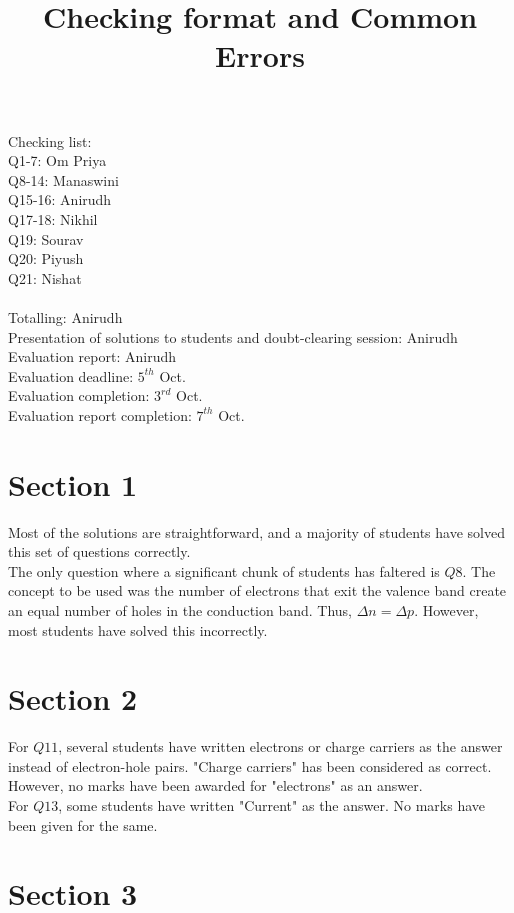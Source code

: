 \documentclass[12pt]{article}\date{}
\begin{document}
\title{Checking format and Common Errors}
\maketitle

\noindent Checking list: \\
Q1-7: Om Priya \\
Q8-14: Manaswini \\
Q15-16: Anirudh \\
Q17-18: Nikhil \\
Q19: Sourav \\
Q20: Piyush \\
Q21: Nishat \\ \\
Totalling: Anirudh \\
Presentation of solutions to students and doubt-clearing session: Anirudh \\
Evaluation report: Anirudh \\

\noindent Evaluation deadline: $5^{th}$ Oct. \\ 
Evaluation completion: $3^{rd}$ Oct. \\
Evaluation report completion: $7^{th}$ Oct. \\

\section{Section 1}
Most of the solutions are straightforward, and a majority of students have solved this set of questions correctly. \\ The only question where a significant chunk of students has faltered is $Q8$. The concept to be used was the number of electrons that exit the valence band create an equal number of holes in the conduction band. Thus, $\Delta n= \Delta p$. However, most students have solved this incorrectly.
\section{Section 2}
For $Q11$, several students have written electrons or charge carriers as the answer instead of electron-hole pairs. "Charge carriers" has been considered as correct. However, no marks have been awarded for "electrons" as an answer. \\
For $Q13$, some students have written "Current" as the answer. No marks have been given for the same.

\section{Section 3}
\end{document}
